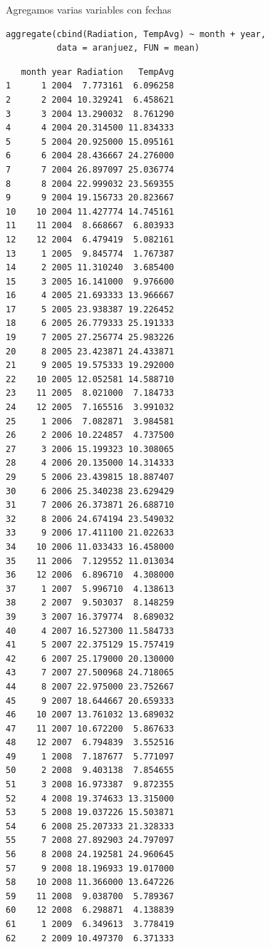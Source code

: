 \documentclass[xcolor={usenames,svgnames,dvipsnames}]{beamer}
\begin{document}
\begin{frame}[fragile,label=sec-5-3-5]{Agregamos varias variables con fechas}
 \lstset{language=R,label= ,caption= ,numbers=none}
\begin{lstlisting}
aggregate(cbind(Radiation, TempAvg) ~ month + year,
          data = aranjuez, FUN = mean)
\end{lstlisting}

\begin{verbatim}
   month year Radiation   TempAvg
1      1 2004  7.773161  6.096258
2      2 2004 10.329241  6.458621
3      3 2004 13.290032  8.761290
4      4 2004 20.314500 11.834333
5      5 2004 20.925000 15.095161
6      6 2004 28.436667 24.276000
7      7 2004 26.897097 25.036774
8      8 2004 22.999032 23.569355
9      9 2004 19.156733 20.823667
10    10 2004 11.427774 14.745161
11    11 2004  8.668667  6.803933
12    12 2004  6.479419  5.082161
13     1 2005  9.845774  1.767387
14     2 2005 11.310240  3.685400
15     3 2005 16.141000  9.976600
16     4 2005 21.693333 13.966667
17     5 2005 23.938387 19.226452
18     6 2005 26.779333 25.191333
19     7 2005 27.256774 25.983226
20     8 2005 23.423871 24.433871
21     9 2005 19.575333 19.292000
22    10 2005 12.052581 14.588710
23    11 2005  8.021000  7.184733
24    12 2005  7.165516  3.991032
25     1 2006  7.082871  3.984581
26     2 2006 10.224857  4.737500
27     3 2006 15.199323 10.308065
28     4 2006 20.135000 14.314333
29     5 2006 23.439815 18.887407
30     6 2006 25.340238 23.629429
31     7 2006 26.373871 26.688710
32     8 2006 24.674194 23.549032
33     9 2006 17.411100 21.022633
34    10 2006 11.033433 16.458000
35    11 2006  7.129552 11.013034
36    12 2006  6.896710  4.308000
37     1 2007  5.996710  4.138613
38     2 2007  9.503037  8.148259
39     3 2007 16.379774  8.689032
40     4 2007 16.527300 11.584733
41     5 2007 22.375129 15.757419
42     6 2007 25.179000 20.130000
43     7 2007 27.500968 24.718065
44     8 2007 22.975000 23.752667
45     9 2007 18.644667 20.659333
46    10 2007 13.761032 13.689032
47    11 2007 10.672200  5.867633
48    12 2007  6.794839  3.552516
49     1 2008  7.187677  5.771097
50     2 2008  9.403138  7.854655
51     3 2008 16.973387  9.872355
52     4 2008 19.374633 13.315000
53     5 2008 19.037226 15.503871
54     6 2008 25.207333 21.328333
55     7 2008 27.892903 24.797097
56     8 2008 24.192581 24.960645
57     9 2008 18.196933 19.017000
58    10 2008 11.366000 13.647226
59    11 2008  9.038700  5.789367
60    12 2008  6.298871  4.138839
61     1 2009  6.349613  3.778419
62     2 2009 10.497370  6.371333

\end{verbatim}
\end{frame}
\end{document}
